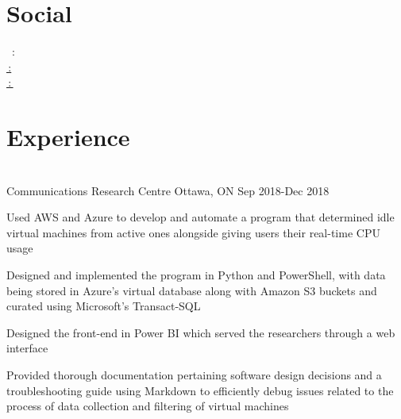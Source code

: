 \documentclass[]{deedy-resume-openfont}
\begin{document}
\begin{minipage}[t]{0.33\textwidth}
\section{Social}
{\faLinkedinSquare \, : } \\
\href{https://github.com/HBaig30}{\faGithubSquare \,: } \\
\href{http://www.hamzais.me/}{\faGlobe\,:\,}

\sectionsep



%
%

\end{minipage} 
\hfill
\begin{minipage}[t]{0.66\textwidth} 


\section{Experience}
\vspace{0.5em}
\\
{Communications Research Centre \textbullet{} Ottawa, ON \textbullet{} Sep 2018-Dec 2018}
\begin{tightemize}
\item Used AWS and Azure to develop and automate a program that determined idle virtual machines from active ones alongside giving users their real-time CPU usage 
\item Designed and implemented the program in Python and PowerShell, with data being stored in Azure’s virtual
database along with Amazon S3 buckets and curated using Microsoft’s Transact-SQL
\item Designed the front-end in Power BI which served the researchers through a web interface
\item Provided thorough documentation pertaining software design decisions and a troubleshooting guide using
Markdown to efficiently debug issues related to the process of data collection and filtering of virtual machines 


\end{tightemize}
\end{minipage}
\end{document}

